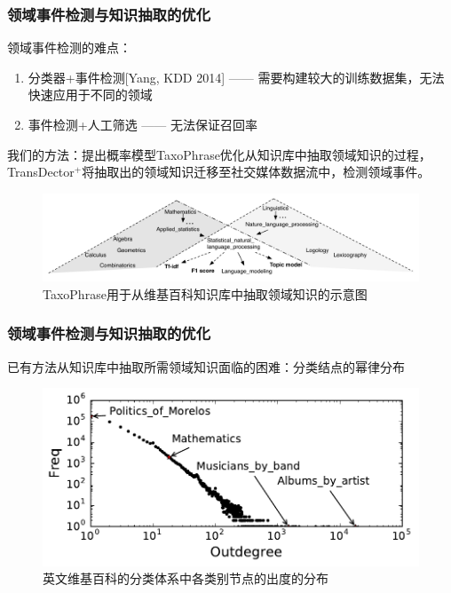 \begin{frame}
\frametitle{\noindent 领域事件检测与知识抽取的优化}	
领域事件检测的难点：
\begin{enumerate}
	\item 分类器+事件检测[Yang, KDD 2014] —— 需要构建较大的训练数据集，无法快速应用于不同的领域
	\item 事件检测+人工筛选 —— 无法保证召回率
\end{enumerate}

\color{blue}我们的方法：提出概率模型TaxoPhrase优化从知识库中抽取领域知识的过程，TransDector$^+$将抽取出的领域知识迁移至社交媒体数据流中，检测领域事件。

\vspace{-5mm}
\begin{figure}
	\caption{TaxoPhrase用于从维基百科知识库中抽取领域知识的示意图}
    \includegraphics[width=1.0\textwidth]{img/TD+/taxophrase_motivation.pdf}
\end{figure}
\end{frame}

\begin{frame}
\frametitle{\noindent 领域事件检测与知识抽取的优化}	
已有方法从知识库中抽取所需领域知识面临的困难：分类结点的幂律分布
\vspace{-0.5cm}
\begin{figure}
	\caption{英文维基百科的分类体系中各类别节点的出度的分布}
    \includegraphics[width=1.0\textwidth]{img/TD+/outdegree_distribution.pdf}
\end{figure}
\end{frame}

